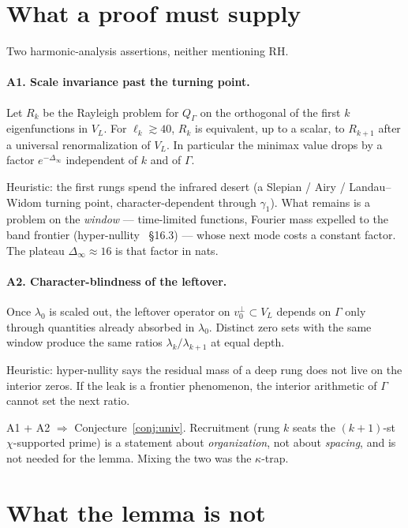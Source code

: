 \documentclass[10pt]{article}
\theoremstyle{definition}
\begin{document}
\section{What a proof must supply}

Two harmonic-analysis assertions, neither mentioning RH.

\paragraph{A1. Scale invariance past the turning point.}
Let $R_k$ be the Rayleigh problem for $Q_\Gamma$ on the orthogonal of
the first $k$ eigenfunctions in $V_L$. For $\ell_k\gtrsim40$, $R_k$ is
equivalent, up to a scalar, to $R_{k+1}$ after a universal
renormalization of $V_L$. In particular the minimax value drops by a
factor $e^{-\Delta_\infty}$ independent of $k$ and of $\Gamma$.

Heuristic: the first rungs spend the infrared desert (a Slepian /
Airy / Landau--Widom turning point, character-dependent through
$\gamma_1$). What remains is a problem on the \emph{window} ---
time-limited functions, Fourier mass expelled to the band frontier
(hyper-nullity~\cite{LabNB} \S16.3) --- whose next mode costs a
constant factor. The plateau $\Delta_\infty\approx16$ is that factor
in nats.

\paragraph{A2. Character-blindness of the leftover.}
Once $\lambda_0$ is scaled out, the leftover operator on
$v_0^\perp\subset V_L$ depends on $\Gamma$ only through quantities
already absorbed in $\lambda_0$. Distinct zero sets with the same
window produce the same ratios $\lambda_k/\lambda_{k+1}$ at equal
depth.

Heuristic: hyper-nullity says the residual mass of a deep rung does
not live on the interior zeros. If the leak is a frontier phenomenon,
the interior arithmetic of $\Gamma$ cannot set the next ratio.

A1 + A2 $\Rightarrow$ Conjecture~\ref{conj:univ}. Recruitment (rung
$k$ seats the $(k{+}1)$-st $\chi$-supported prime) is a statement
about \emph{organization}, not about \emph{spacing}, and is not
needed for the lemma. Mixing the two was the $\kappa$-trap.

\section{What the lemma is not}
\end{document}
